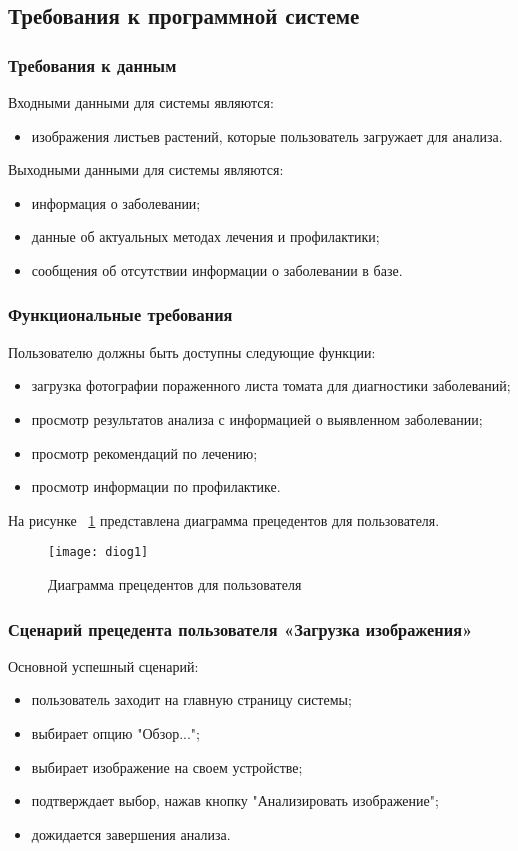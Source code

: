 \subsection{Требования к программной системе}

\subsubsection{Требования к данным}
Входными данными для системы являются:
\begin{itemize}
	\item изображения листьев растений, которые пользователь загружает для анализа.
\end{itemize}
Выходными данными для системы являются:
\begin{itemize}
	\item информация о заболевании;
	\item данные об актуальных методах лечения и профилактики;
	\item сообщения об отсутствии информации о заболевании в базе.
\end{itemize}

\subsubsection{Функциональные требования}
Пользователю должны  быть доступны следующие функции:
\begin{itemize}
	\item загрузка фотографии пораженного листа томата для диагностики заболеваний;
	\item просмотр результатов анализа с информацией о выявленном заболевании;
	\item просмотр рекомендаций по лечению;
	\item просмотр информации по профилактике.
\end{itemize}
На рисунке ~\ref{diog1:image} представлена диаграмма прецедентов для пользователя.

\begin{figure}[H]
	\texttt{[image: diog1]}
	\caption{Диаграмма прецедентов для пользователя}
	\label{diog1:image}
\end{figure}

\subsubsection{Сценарий прецедента пользователя «Загрузка изображения»}
Основной успешный сценарий:
\begin{itemize}
	\item пользователь заходит на главную страницу системы;
	\item выбирает опцию "Обзор...";
	\item выбирает изображение на своем устройстве;
	\item подтверждает выбор, нажав кнопку "Анализировать изображение";
	\item дожидается завершения анализа.
\end{itemize}

